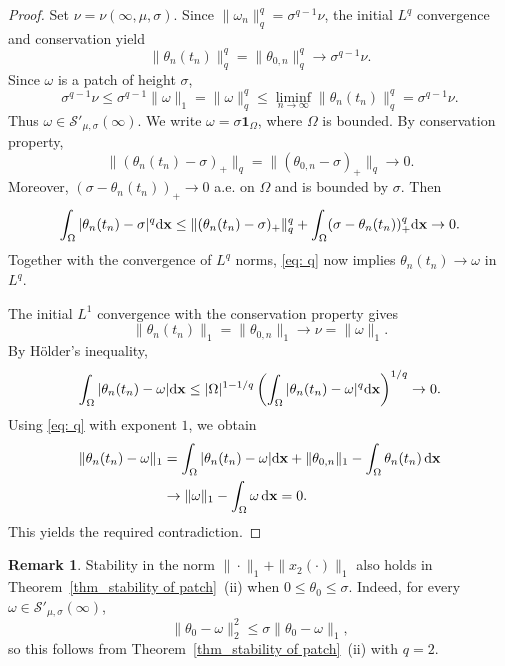 \documentclass[11pt]{amsart}
\theoremstyle{definition}
\theoremstyle{definition}
\newtheorem{remark}[theorem]{Remark}
\numberwithin{equation}{section}
\newcommand{\0}{\emptyset}
\newcommand{\bfx}{{\bf x}}
\newcommand{\calS}{\mathcal S}
\newcommand{\dd}{\mathrm{d}}
\begin{document}
\begin{proof}
{                Set $\nu = \nu(\infty,\mu,\sigma)$.
                Since $\|\omega_n\|_q^q = \sigma^{q-1}\nu$, the initial $L^q$ convergence and conservation yield
                \[
                \|\theta_n(t_n)\|_q^q = \|\theta_{0,n}\|_q^q \to \sigma^{q-1} \nu.
                \]
                Since $\omega$ is a patch of height $\sigma$, 
                \[
                \sigma^{q-1}\nu \le \sigma^{q-1}\|\omega\|_1 = \|\omega\|_q^q \le \liminf_{n\to\infty}\|\theta_n(t_n)\|_q^q = \sigma^{q-1}\nu.
                \]
                Thus $\omega\in\calS'_{\mu,\sigma}(\infty)$.
                We write $\omega = \sigma\mathbf{1}_{\Omega}$, where $\Omega$ is bounded.
                By conservation property,
                \[
                \|(\theta_n(t_n)-\sigma)_+\|_q = \|(\theta_{0,n}-\sigma)_+\|_q \to 0.
                \]
                Moreover, $(\sigma - \theta_n(t_n))_+ \to 0$ a.e. on $\Omega$ and is bounded by $\sigma$.
                Then
                \[
                \int_{\Omega}|\theta_n(t_n)-\sigma|^q \dd\bfx \le \|(\theta_n(t_n)-\sigma)_+\|_q^q + \int_{\Omega}(\sigma-\theta_n(t_n))_+^q\dd\bfx \to 0.
                \]
                Together with the convergence of $L^q$ norms, \eqref{eq: q} now implies $\theta_n(t_n)\to\omega$ in $L^q$.

                The initial $L^1$ convergence with the conservation property gives 
                \[
                \|\theta_n(t_n)\|_1 = \|\theta_{0,n}\|_1 \to \nu = \|\omega\|_1.
                \]
                By H\"older's inequality,
                \[
                \int_\Omega |\theta_n(t_n) - \omega| \dd\bfx \le |\Omega|^{1-1/q} \left( \int_\Omega |\theta_n(t_n)-\omega|^q\dd\bfx \right)^{1/q} \to 0.
                \]
                Using \eqref{eq: q} with exponent $1$, we obtain
                \[
                \begin{aligned}
                \|\theta_n(t_n) - \omega\|_1 & = \int_\Omega|\theta_n(t_n)-\omega| \dd\bfx + \|\theta_{0,n}\|_1 - \int_\Omega\theta_n(t_n)\,\dd\bfx\\
                & \to  \|\omega\|_1 - \int_\Omega\omega \,\dd\bfx = 0.
                \end{aligned}
                \]
                This yields the required contradiction.
                }
			\end{proof}

            {
            \begin{remark}
            Stability in the norm $\|\cdot\|_1+\|x_2(\cdot)\|_1$ also holds in Theorem~\ref{thm_stability of patch}~(ii) when $0 \le \theta_0 \le \sigma$.
            Indeed, for every $\omega\in\calS'_{\mu,\sigma}(\infty)$,
            \[
            \|\theta_0 - \omega\|_2^2    \le \sigma \|\theta_0-\omega\|_1,
            \]
            so this follows from Theorem~\ref{thm_stability of patch}~(ii) with $q=2$.
            \end{remark}
            }
			
\end{document}

